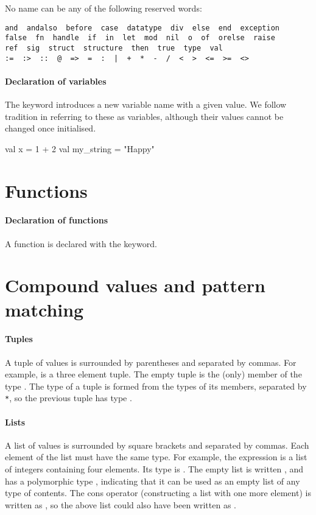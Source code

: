\documentclass[12pt,a4paper]{book}
\begin{document}
No name can be any of the following reserved words:
\begin{verbatim}
and  andalso  before  case  datatype  div  else  end  exception
false  fn  handle  if  in  let  mod  nil  o  of  orelse  raise
ref  sig  struct  structure  then  true  type  val
:=  :>  ::  @  =>  =  :  |  +  *  -  /  <  >  <=  >=  <>
\end{verbatim}

\paragraph{Declaration of variables} The  keyword introduces a new variable name with a given value.
We follow tradition in referring to these as variables, although their values
cannot be changed once initialised.
\begin{smlcode}
val x = 1 + 2
val my_string = "Happy"
\end{smlcode}

\section{Functions}
\label{sect:func}

\paragraph{Declaration of functions}
A function is declared with the  keyword.



\section{Compound values and pattern matching}
\label{sect:compound}

\paragraph{Tuples} A tuple of values is surrounded by parentheses and separated by commas. For example,  is a three element tuple. The empty tuple \smlinline{()} is the (only) member of the type . The type of a tuple is formed from the types of its members, separated by \texttt{*}, so the previous tuple has type .

\paragraph{Lists} A list of values is surrounded by square brackets and separated by commas. Each element of the list must have the same type. For example, the expression \smlinline{[1,2,3,4]} is a list of integers containing four elements. Its type is . The empty list is written \smlinline{[]}, and has a polymorphic type , indicating that it can be used as an empty list of any type of contents. The cons operator (constructing a list with one more element) is written as \smlinline{::}, so the above list could also have been written as .
\end{document}
